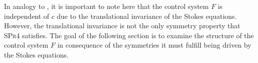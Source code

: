  In analogy to \cite{Alouges2017}, it is important to note here that the control system $F$ is independent of $c$ due to the translational invariance of the Stokes equations. However, the translational invariance is not the only symmetry property that \textsc{SPr4} satisfies. The goal of the following section is to examine the structure of the control system $F$ in consequence of the symmetries it must fulfill being driven by the Stokes equations.




























